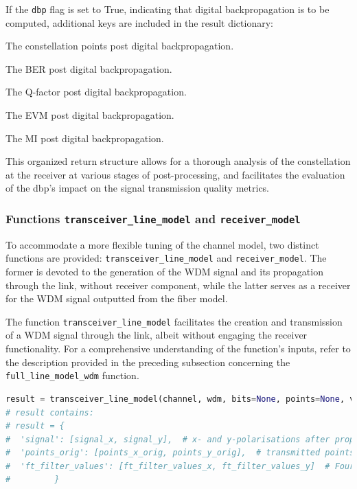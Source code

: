 If the \texttt{dbp} flag is set to True, indicating that digital backpropagation is to be computed, additional keys are included in the result dictionary:

\begin{description}[style=multiline, leftmargin=4cm, font=\normalfont]
    \item[\texttt{points\_dbp}] The constellation points post digital backpropagation.
    \item[\texttt{ber\_dbp}] The BER post digital backpropagation.
    \item[\texttt{q\_dbp}] The Q-factor post digital backpropagation.
    \item[\texttt{evm\_dbp}] The EVM post digital backpropagation.
    \item[\texttt{mi\_dbp}] The MI post digital backpropagation.
\end{description}

This organized return structure allows for a thorough analysis of the constellation at the receiver at various stages of post-processing, and facilitates the evaluation of the \Gls{dbp}'s impact on the signal transmission quality metrics.


\subsubsection{Functions \texttt{transceiver\_line\_model} and \texttt{receiver\_model}}
To accommodate a more flexible tuning of the channel model, two distinct functions are provided: \texttt{transceiver\_line\_model} and \texttt{receiver\_model}. The former is devoted to the generation of the WDM signal and its propagation through the link, without receiver component, while the latter serves as a receiver for the WDM signal outputted from the fiber model.

The function \texttt{transceiver\_line\_model} facilitates the creation and transmission of a WDM signal through the link, albeit without engaging the receiver functionality. For a comprehensive understanding of the function's inputs, refer to the description provided in the preceding subsection concerning the \texttt{full\_line\_model\_wdm} function.

\begin{lstlisting}[language=Python, caption=Usage of \texttt{transceiver\_line\_model} function, label=lst:tx_line_model]
result = transceiver_line_model(channel, wdm, bits=None, points=None, verbose=0, dbp=False, ft_filter_values_tx=None)
# result contains:
# result = {
#  'signal': [signal_x, signal_y],  # x- and y-polarisations after propagation
#  'points_orig': [points_x_orig, points_y_orig],  # transmitted points for x- and y-
#  'ft_filter_values': [ft_filter_values_x, ft_filter_values_y]  # Fourier coefficients for filter used to create WDM signal for x- and y-
#         }
\end{lstlisting}

